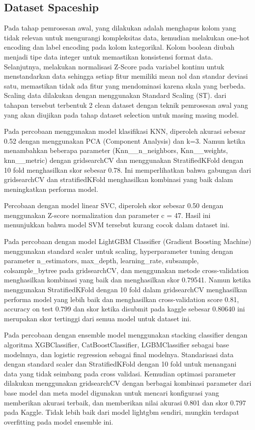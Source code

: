 \documentclass[conference]{IEEEtran}
\begin{document}
\subsection{Dataset Spaceship}

Pada tahap pemrosesan awal, yang dilakukan adalah menghapus kolom yang tidak relevan untuk mengurangi kompleksitas data, kemudian melakukan one-hot encoding 
dan label encoding pada kolom kategorikal. Kolom boolean diubah menjadi tipe data integer untuk memastikan konsistensi format data. Selanjutnya, melakukan normalisasi Z-Score pada variabel 
kontinu untuk menstandarkan data sehingga setiap fitur memiliki mean nol dan standar deviasi satu, memastikan tidak ada fitur yang mendominasi karena skala yang berbeda. Scaling data dilakukan dengan menggunakan 
Standard Scaling (ST). dari tahapan tersebut terbentuk 2 clean dataset dengan teknik pemrosesan awal yang yang akan diujikan pada tahap dataset selection untuk masing masing model.

Pada percobaan menggunakan model klasifikasi KNN, diperoleh akurasi sebesar 0.52 dengan menggunakan PCA (Component Analysis) dan k=3. Namun ketika menambahkan beberapa parameter 
(Knn\_\_n\_neighbors, Knn\_\_weights, knn\_\_metric) dengan gridsearchCV dan menggunakan StratifiedKFold dengan 10 fold menghasilkan skor sebesar 0.78. 
Ini memperlihatkan bahwa gabungan dari gridsearchCV dan stratifiedKFold menghasilkan kombinasi yang baik dalam meningkatkan performa model.

Percobaan dengan model linear SVC, diperoleh skor sebesar 0.50 dengan menggunakan Z-score normalization dan parameter c = 47.
Hasil ini menunjukkan bahwa model SVM tersebut kurang cocok dalam dataset ini.

Pada percobaan dengan model LightGBM Classifier (Gradient Boosting Machine) menggunakan standard scaler untuk scaling, hyperparameter tuning dengan parameter  
n\_estimators, max\_depth, learning\_rate, subsample, colsample\_bytree pada gridsearchCV, dan menggunakan metode cross-validation menghasilkan kombinasi 
yang baik dan menghasilkan skor 0.79541. Namun ketika menggunakan StratifiedKFold dengan 10 fold dalam gridsearchCV menghasilkan performa model yang lebih baik 
dan menghasilkan cross-validation score 0.81, accuracy on test 0.799 dan skor ketika disubmit pada kaggle sebesar 0.80640 ini merupakan skor tertinggi dari semua model untuk dataset ini.

Pada percobaan dengan ensemble model menggunakan stacking classifier dengan algoritma XGBClassifier, CatBoostClassifier, LGBMClassifier sebagai base modelnnya, dan logistic regression sebagai final modelnya. 
Standarisasi data dengan standard scaler dan StratifiedKFold dengan 10 fold untuk menangani data yang tidak seimbang pada cross validasi. Kemudian optimasi parameter dilakukan menggunakan gridsearchCV dengan berbagai 
kombinasi parameter dari base model dan meta model digunakan untuk mencari konfigurasi yang memberikan akurasi terbaik, dan memberikan nilai akurasi 0.801 dan skor 0.797 pada Kaggle. Tidak lebih baik dari model lightgbm sendiri, 
mungkin terdapat overfitting pada model ensemble ini.
\end{document}
